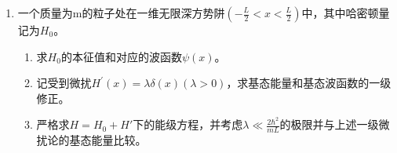 \begin{enumerate}
{\begin{enumerate}
		\item $L_y$ 的本征值为 $1,0,-1$，故多项式
		$x^3-x$ 在其每个本征值上均为零。由谱定理
		\[
			\boxed{L_y^3=L_y}.
		\]
		也可直接将上一矩阵相乘验证。

		\item 利用 $L_y^{2k+1}=L_y$（$k\ge0$）及
		$L_y^{2k}=L_y^2$（$k\ge1$），指数级数化为
		\begin{align*}
			e^{-i\lambda L_y}
			&=I+\left(\sum_{k=0}^{\infty}
			\frac{(-i\lambda)^{2k+1}}{(2k+1)!}\right)L_y
			+\left(\sum_{k=1}^{\infty}
			\frac{(-i\lambda)^{2k}}{(2k)!}\right)L_y^2\\
			&=\boxed{I-iL_y\sin\lambda-(1-\cos\lambda)L_y^2}.
		\end{align*}

		\item 在 $(L^2,L_y)$ 表象中 $L_y=\operatorname{diag}(1,0,-1)$，所以
		\[
			\boxed{e^{-i\lambda L_y}
			=\begin{pmatrix}
			e^{-i\lambda}&0&0\\
			0&1&0\\
			0&0&e^{i\lambda}
			\end{pmatrix}}.
		\]
	\end{enumerate}
}


\newpage	
	\item 
	一个质量为m的粒子处在一维无限深方势阱\(\left(-\frac{L}{2}<x<\frac{L}{2}\right)\)中，其中哈密顿量记为\(H_0\)。
	\begin{enumerate}
		\item
求\(H_0\)的本征值和对应的波函数\(\psi(x)\)。
	
	\item 
	记受到微扰\(H^{\prime}(x)=\lambda \delta(x)(\lambda>0)\)，求基态能量和基态波函数的一级修正。
	
	\item 
	严格求\(H=H_{0}+H'\)下的能级方程，并考虑\(\lambda \ll \frac{2 \hbar^{2}}{m L}\)的极限并与上述一级微扰论的基态能量比较。
\end{enumerate}	

\end{enumerate}
